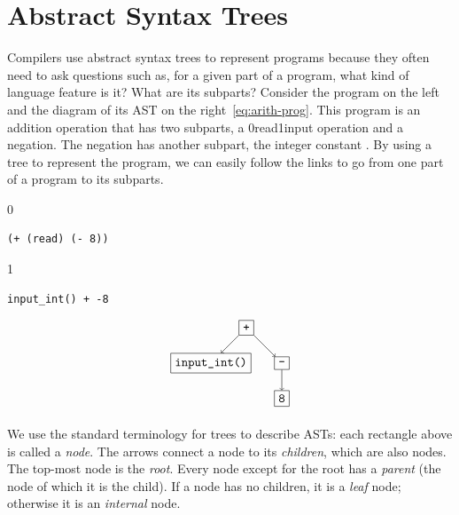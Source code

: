 \documentclass[7x10]{TimesAPriori_MIT}%
\def\racketEd{0}
\def\pythonEd{1}
\def\edition{1}
\newcommand{\racket}[1]{{\if\edition\racketEd{#1}\fi}}
\newcommand{\pythonColor}[0]{}
\newcommand{\python}[1]{{\if\edition\pythonEd\pythonColor #1\fi}}
\numberwithin{theorem}{chapter}
\numberwithin{definition}{chapter}
\numberwithin{equation}{chapter}
\begin{document}
\section{Abstract Syntax Trees}
\label{sec:ast}

Compilers use abstract syntax trees to represent programs because they
often need to ask questions such as, for a given part of a program,
what kind of language feature is it? What are its subparts? Consider
the program on the left and the diagram of its AST on the
right~\eqref{eq:arith-prog}. This program is an addition operation
that has two subparts, a \racket{read}\python{input} operation and a
negation. The negation has another subpart, the integer constant
. By using a tree to represent the program, we can easily
follow the links to go from one part of a program to its subparts.
\begin{center}
\begin{minipage}{0.4\textwidth}
{\if\edition\racketEd
\begin{lstlisting}
(+ (read) (- 8))
\end{lstlisting}
\fi}
{\if\edition\pythonEd\pythonColor
\begin{lstlisting}
input_int() + -8
\end{lstlisting}
\fi}
\end{minipage}
\begin{minipage}{0.4\textwidth}
\begin{equation}
\begin{tikzpicture}
 \node[draw] (plus)  at (0 ,  0) {\key{+}};
 \node[draw] (read)  at (-1, -1) {\racket{\footnotesize\key{read}}\python{\key{input\_int()}}};
 \node[draw] (minus) at (1 , -1) {$\key{-}$};
 \node[draw] (8)     at (1 , -2) {\key{8}};

 \draw[->] (plus) to (read);
 \draw[->] (plus) to (minus);
 \draw[->] (minus) to (8);
\end{tikzpicture}
\label{eq:arith-prog}
\end{equation}
\end{minipage}
\end{center}

We use the standard terminology for trees to describe ASTs: each
rectangle above is called a \emph{node}. The arrows connect a node to its
\emph{children}, which are also nodes. The top-most node is the
\emph{root}.  Every node except for the root has a \emph{parent} (the
node of which it is the child). If a node has no children, it is a
\emph{leaf} node; otherwise it is an \emph{internal} node.
\end{document}
